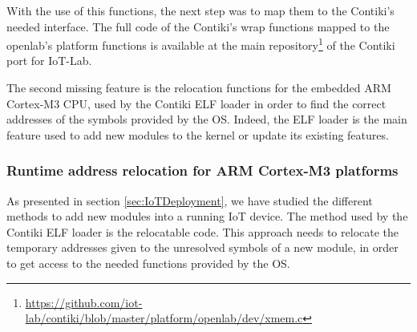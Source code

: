 With the use of this functions, the next step was to map them to the Contiki's needed interface.
The full code of the Contiki's wrap functions mapped to the openlab's platform functions is available at the main repository\footnote{\url{https://github.com/iot-lab/contiki/blob/master/platform/openlab/dev/xmem.c}} of the Contiki port for IoT-Lab. 

The second missing feature is the relocation functions for the embedded ARM Cortex-M3 CPU, used by the Contiki ELF loader in order to find the correct addresses of the symbols provided by the OS.
Indeed, the ELF loader is the main feature used to add new modules to the kernel or update its existing features.

\subsubsection{Runtime address relocation for ARM Cortex-M3 platforms}
As presented in section \ref{sec:IoTDeployment}, we have studied the different methods to add new modules into a running IoT device.
The method used by the Contiki ELF loader is the relocatable code.
This approach needs to relocate the temporary addresses given to the unresolved symbols of a new module, in order to get access to the needed functions provided by the OS.

